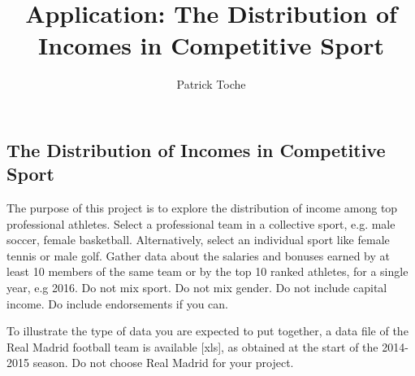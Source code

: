 \documentclass[a4,11pt]{article}%
\title{Application: The Distribution of Incomes in Competitive Sport}
\author{Patrick Toche}
\date{}
\begin{document}
\maketitle

\newpage


\subsection*{The Distribution of Incomes in Competitive Sport}

The purpose of this project is to explore the distribution of income among top professional athletes. Select a professional team in a collective sport, e.g. male soccer, female basketball. Alternatively, select an individual sport like female tennis or male golf. Gather data about the salaries and bonuses earned by at least 10 members of the same team or by the top 10 ranked athletes, for a single year, e.g 2016. Do not mix sport. Do not mix gender. Do not include capital income. Do include endorsements if you can.

To illustrate the type of data you are expected to put together, a data file of the Real Madrid football team is available [xls], as obtained at the start of the 2014-2015 season. Do not choose Real Madrid for your project.
\end{document}
